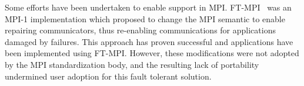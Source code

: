 

Some efforts have been undertaken to enable \abft support in MPI. 
FT-MPI~\cite{fagg2000ft} was an MPI-1 implementation which proposed to
change the MPI semantic to enable repairing communicators, thus
re-enabling communications for applications damaged by failures. This
approach has proven successful and applications have been
implemented using FT-MPI. However, these modifications were not adopted by
the MPI standardization body, and the resulting lack of portability
undermined user adoption for this fault tolerant solution.





